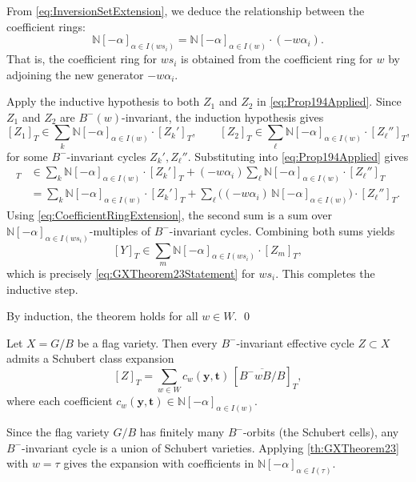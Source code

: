 \begin{Proof}
From \cref{eq:InversionSetExtension}, we deduce the relationship between the coefficient rings:
\begin{equation}
\mathbb{N}[-\alpha]_{\alpha \in I(ws_i)} = \mathbb{N}[-\alpha]_{\alpha \in I(w)} \cdot (-w\alpha_i).
\label{eq:CoefficientRingExtension}
\end{equation}
That is, the coefficient ring for $ws_i$ is obtained from the coefficient ring for $w$ by adjoining the new generator $-w\alpha_i$.

Apply the inductive hypothesis to both $Z_1$ and $Z_2$ in \cref{eq:Prop194Applied}. Since $Z_1$ and $Z_2$ are $B^-(w)$-invariant, the induction hypothesis gives
$$[Z_1]_T \in \sum_{k} \mathbb{N}[-\alpha]_{\alpha \in I(w)} \cdot [Z_k']_T,\qquad
[Z_2]_T \in \sum_{\ell} \mathbb{N}[-\alpha]_{\alpha \in I(w)} \cdot [Z_\ell'']_T,$$
for some $B^-$-invariant cycles $Z_k', Z_\ell''$. Substituting into \cref{eq:Prop194Applied} gives
\begin{align*}
[Y]_T &\in \sum_k \mathbb{N}[-\alpha]_{\alpha \in I(w)} \cdot [Z_k']_T + (-w\alpha_i) \sum_\ell \mathbb{N}[-\alpha]_{\alpha \in I(w)} \cdot [Z_\ell'']_T \\
&= \sum_k \mathbb{N}[-\alpha]_{\alpha \in I(w)} \cdot [Z_k']_T + \sum_\ell \bigl((-w\alpha_i)\,\mathbb{N}[-\alpha]_{\alpha \in I(w)}\bigr) \cdot [Z_\ell'']_T.
\end{align*}
Using \cref{eq:CoefficientRingExtension}, the second sum is a sum over $\mathbb{N}[-\alpha]_{\alpha \in I(ws_i)}$-multiples of $B^-$-invariant cycles. Combining both sums yields
$$[Y]_T \in \sum_{m} \mathbb{N}[-\alpha]_{\alpha \in I(ws_i)} \cdot [Z_m]_T,$$
which is precisely \cref{eq:GXTheorem23Statement} for $ws_i$. This completes the inductive step.

By induction, the theorem holds for all $w \in W$. \qed
\end{Proof}

\begin{Corollary}\label{cor:GXCorollary24}
Let $X = G/B$ be a flag variety. Then every $B^-$-invariant effective cycle $Z \subset X$ admits a Schubert class expansion
$$[Z]_T = \sum_{w \in W} c_w(\mathbf{y},\mathbf{t})\,[\overline{B^-wB/B}]_T,$$
where each coefficient $c_w(\mathbf{y},\mathbf{t}) \in \mathbb{N}[-\alpha]_{\alpha \in I(w)}$.

\begin{Proof}
Since the flag variety $G/B$ has finitely many $B^-$-orbits (the Schubert cells), any $B^-$-invariant cycle is a union of Schubert varieties. Applying \cref{th:GXTheorem23} with $w = \tau$ gives the expansion with coefficients in $\mathbb{N}[-\alpha]_{\alpha \in I(\tau)}$.
\end{Proof}
\end{Corollary}

